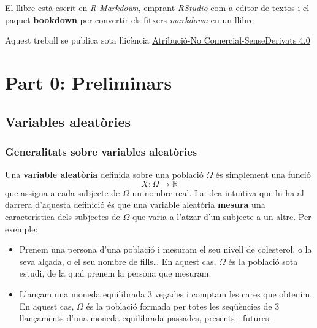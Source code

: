 \documentclass[
]{book}
\theoremstyle{definition}
\theoremstyle{definition}
\theoremstyle{definition}
\theoremstyle{remark}
\begin{document}
El llibre està escrit en \emph{R Markdown}, emprant \emph{RStudio} com a editor de textos i el paquet \textbf{bookdown} per convertir els fitxers \emph{markdown} en un llibre

Aquest treball se publica sota llicència \href{https://creativecommons.org/licenses/by-nc-nd/4.0/}{Atribució-No Comercial-SenseDerivats 4.0}

\hypertarget{part-part-0-preliminars}{%
\part*{Part 0: Preliminars}\label{part-part-0-preliminars}}

\hypertarget{chap:varal}{%
\chapter{Variables aleatòries}\label{chap:varal}}

\hypertarget{generalitats-sobre-variables-aleatuxf2ries}{%
\section{Generalitats sobre variables aleatòries}\label{generalitats-sobre-variables-aleatuxf2ries}}

Una \textbf{variable aleatòria} definida sobre una població \(\Omega\) és simplement una funció
\[
X: \Omega\to \mathbb{R}
\]
que assigna a cada subjecte de \(\Omega\) un nombre real. La idea intuïtiva que hi ha al darrera d'aquesta definició és que una variable aleatòria \textbf{mesura} una característica dels subjectes de \(\Omega\) que varia a l'atzar d'un subjecte a un altre. Per exemple:

\begin{itemize}
\item
  Prenem una persona d'una població i mesuram el seu nivell de colesterol, o la seva alçada, o el seu nombre de fills\ldots{} En aquest cas, \(\Omega\) és la població sota estudi, de la qual prenem la persona que mesuram.
\item
  Llançam una moneda equilibrada 3 vegades i comptam les cares que obtenim. En aquest cas, \(\Omega\) és la població formada per totes les seqüències de 3 llançaments d'una moneda equilibrada passades, presents i futures.
\end{itemize}
\end{document}
